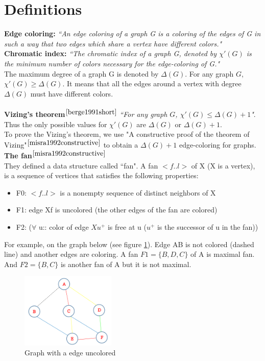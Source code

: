 \section{Definitions}
\textbf{Edge coloring:} 
\textit{``An edge coloring of a graph G is a coloring of the edges of G in such a way that two edges which share a vertex have different colors."}
\\[0.5cm]
\textbf{Chromatic index:}
\textit{``The chromatic index of a graph G, denoted by ${\chi'(G)}$ is the minimum number of colors necessary for the edge-coloring of G."}
\\[0.5cm]
The maximum degree of a graph G is denoted by $\Delta(G)$. For any graph $G$, $\chi'(G) \geq \Delta(G)$. It means that all the edges around a vertex with degree $\Delta(G)$ must have different colors.
\\\\
\textbf{Vizing's theorem}$^{\cite{berge1991short}}$
\textit{``For any graph $G$, $\chi'(G) \leq \Delta(G) + 1$"}.
\\
Thus the only possible values for $\chi'(G)$ are $\Delta(G)$ or $\Delta(G)+ 1$.\\
To prove the Vizing's theorem, we use "A constructive proof of the theorem of Vizing"$^{\cite{misra1992constructive}}$ to obtain a $\Delta(G)+ 1$ edge-coloring for graphs.\\[0.5cm]
\textbf{The fan}$^{\cite{misra1992constructive}}$~\\
They defined a data structure called ``fan". A fan $<f..l>$ of X (X is a vertex), is a sequence of vertices that satisfies the following properties:
\begin{itemize}
\item F0: $<f..l>$ is a nonempty sequence of distinct neighbors of X
\item F1: edge Xf is uncolored (the other edges of the fan are colored)
\item F2: ($\forall$ u:: color of edge $Xu^+$ is free at u ($u^+$ is the successor of u in the fan))
\end{itemize}
For example, on the graph below (see figure \ref{fig:fan}). Edge AB is not colored (dashed line) and another edges are coloring. A fan $F1= \{ B, D, C\}$ of A is maximal fan. And $F2 = \{ B, C\}$ is another fan of A but it is not maximal.
\\
\begin{figure}[h!]
\centering
\includegraphics[width=0.4\textwidth]{./images/fan}
\caption{Graph with a edge uncolored}
\label{fig:fan}
\end{figure}
